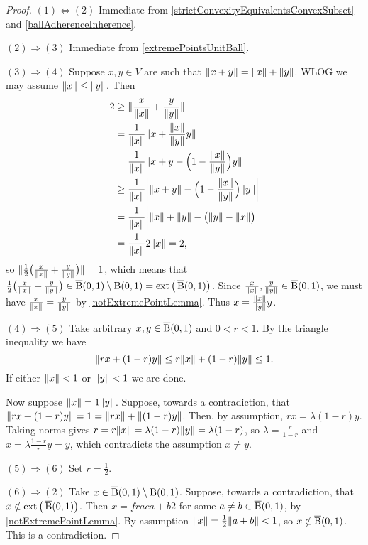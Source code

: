 \begin{proof}
$(1) \Leftrightarrow (2)$ Immediate from \ref{strictConvexityEquivalentsConvexSubset} and \ref{ballAdherenceInherence}.

$(2) \Rightarrow (3)$ Immediate from \ref{extremePointsUnitBall}.

$(3) \Rightarrow (4)$ Suppose $x,y\in V$ are such that $\lVert x+y\rVert = \lVert x\rVert + \lVert y\rVert$. WLOG we may assume $\lVert x\rVert\leq \lVert y\rVert$. Then
\begin{align*}
2 &\geq \lVert\frac{x}{\lVert x\rVert} + \frac{y}{\lVert y\rVert}\rVert \\
&= \frac{1}{\lVert x\rVert}\lVert x + \frac{\lVert x\rVert}{\lVert y\rVert}y\rVert \\
&= \frac{1}{\lVert x\rVert}\lVert x + y - \Big(1-\frac{\lVert x\rVert}{\lVert y\rVert}\Big)y\rVert \\
&\geq \frac{1}{\lVert x\rVert}\bigg|\lVert x + y\rVert - \Big(1-\frac{\lVert x\rVert}{\lVert y\rVert}\Big)\lVert y\rVert\bigg| \\
&= \frac{1}{\lVert x\rVert}\bigg|\lVert x\rVert + \lVert y\rVert - \big(\lVert y\rVert- \lVert x\rVert\big)\bigg| \\
&= \frac{1}{\lVert x\rVert}2\lVert x\rVert = 2,
\end{align*}
so $\lVert\frac{1}{2}\big(\frac{x}{\lVert x\rVert} + \frac{y}{\lVert y\rVert}\big)\rVert = 1$, which means that $\frac{1}{2}\big(\frac{x}{\lVert x\rVert} + \frac{y}{\lVert y\rVert}\big) \in \operatorname{\overline{B}}(0,1)\setminus\operatorname{B}(0,1) = \operatorname{ext}\big(\operatorname{\overline{B}}(0,1)\big)$. Since $\frac{x}{\lVert x\rVert}, \frac{y}{\lVert y\rVert}\in\operatorname{\overline{B}}(0,1)$, we must have $\frac{x}{\lVert x\rVert} = \frac{y}{\lVert y\rVert}$ by \ref{notExtremePointLemma}. Thus $x = \frac{\lVert x\rVert}{\lVert y\rVert}y$.

$(4) \Rightarrow (5)$ Take arbitrary $x,y\in \operatorname{\overline{B}}(0,1)$ and $0<r<1$. By the triangle inequality we have
\[ \lVert rx + (1-r)y\rVert \leq r\lVert x\rVert + (1-r)\lVert y\rVert \leq 1. \]
If either $\lVert x\rVert<1$ or $\lVert y\rVert<1$ we are done.

Now suppose $\lVert x\rVert = 1 \lVert y\rVert$. Suppose, towards a contradiction, that $\lVert rx+(1-r)y\rVert = 1 = \lVert rx\rVert + \lVert(1-r)y\rVert$. Then, by assumption, $rx = \lambda (1-r) y$. Taking norms gives $r = r\lVert x\rVert = \lambda (1-r)\lVert y\rVert = \lambda (1-r)$, so $\lambda = \frac{r}{1-r}$ and $x = \lambda \frac{1-r}{r}y = y$, which contradicts the assumption $x\neq y$.

$(5) \Rightarrow (6)$ Set $r = \frac{1}{2}$.

$(6) \Rightarrow (2)$ Take $x\in \operatorname{\overline{B}}(0,1)\setminus \operatorname{B}(0,1)$. Suppose, towards a contradiction, that $x\notin \operatorname{ext}\big(\operatorname{\overline{B}}(0,1)\big)$. Then $x = frac{a+b}{2}$ for some $a\neq b\in \operatorname{\overline{B}}(0,1)$, by \ref{notExtremePointLemma}. By assumption $\lVert x\rVert = \frac{1}{2}\lVert a+b\rVert < 1$, so $x\notin \operatorname{\overline{B}}(0,1)$. This is a contradiction.
\end{proof}

